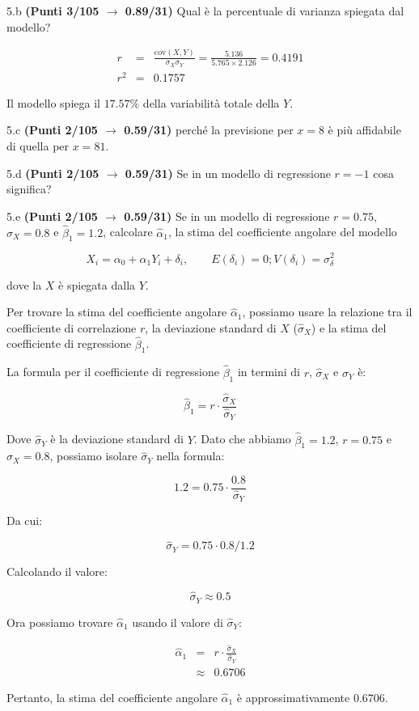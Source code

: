 \documentclass[
  11pt,
]{book}
\theoremstyle{mytheoremstyle}
\theoremstyle{mydefstyle}
\newenvironment{sol}
  {
  \begin{tcolorbox}[enhanced,breakable,arc=0.1mm,boxrule=1pt,colback=white,colframe=iblue,
  title=\bf \fontfamily{lmss}\selectfont \hspace{.5 cm} Soluzione,drop fuzzy shadow]

}{
\end{tcolorbox}
  }
\begin{document}
5.b \textbf{(Punti 3/105 \(\rightarrow\) 0.89/31)} Qual è la percentuale di varianza spiegata dal modello?

\begin{sol}
\begin{eqnarray*}
r&=&\frac{\text{cov}(X,Y)}{\sigma_X\sigma_Y}=\frac{ 5.136 }{ 5.765 \times 2.126 }= 0.4191 \\ 
r^2&=& 0.1757\end{eqnarray*}

Il modello spiega il \(17.57\%\) della variabilità totale della \(Y\).

\end{sol}

5.c \textbf{(Punti 2/105 \(\rightarrow\) 0.59/31)} perché la previsione per \(x=8\) è più affidabile di quella per \(x=81\).

5.d \textbf{(Punti 2/105 \(\rightarrow\) 0.59/31)} Se in un modello di regressione \(r=-1\) cosa significa?

5.e \textbf{(Punti 2/105 \(\rightarrow\) 0.59/31)} Se in un modello di regressione \(r=0.75\), \(\hat\sigma_X=0.8\) e \(\hat\beta_1=1.2\), calcolare
\(\hat\alpha_1\), la stima del coefficiente angolare del modello

\[
X_i = \alpha_0+\alpha_1 Y_i + \delta_i, \qquad E(\delta_i)=0; V(\delta_i)=\sigma_\delta^2
\]

dove la \(X\) è spiegata dalla \(Y\).

\begin{sol}
Per trovare la stima del coefficiente angolare \(\hat\alpha_1\), possiamo usare la relazione tra il coefficiente di correlazione \(r\), la deviazione standard di \(X\) (\(\hat\sigma_X\)) e la stima del coefficiente di regressione \(\hat\beta_1\).

La formula per il coefficiente di regressione \(\hat\beta_1\) in termini di \(r\), \(\hat\sigma_X\) e \(\hat\sigma_Y\) è:

\[
\hat\beta_1 = r \cdot \frac{\hat\sigma_X}{\hat\sigma_Y}
\]

Dove \(\hat\sigma_Y\) è la deviazione standard di \(Y\). Dato che abbiamo \(\hat\beta_1 = 1.2\), \(r = 0.75\) e \(\hat\sigma_X = 0.8\), possiamo isolare \(\hat\sigma_Y\) nella formula:

\[
1.2 = 0.75 \cdot \frac{0.8}{\hat\sigma_Y}
\]

Da cui:

\[
\hat\sigma_Y = 0.75 \cdot 0.8 / 1.2
\]

Calcolando il valore:

\[
\hat\sigma_Y \approx 0.5
\]

Ora possiamo trovare \(\hat\alpha_1\) usando il valore di \(\hat\sigma_Y\):

\begin{eqnarray*}
   \hat\alpha_1 &=& r \cdot \frac{\hat\sigma_X}{\hat\sigma_Y}\\
               &\approx& 0.6706
\end{eqnarray*}

Pertanto, la stima del coefficiente angolare \(\hat\alpha_1\) è approssimativamente 0.6706.

\end{sol}
\end{document}
